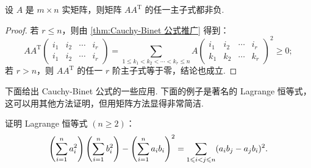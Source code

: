 \begin{corollary}{}{}
    设 $A$ 是 $m \times n$ 实矩阵，则矩阵 $AA^{\mathrm{T}}$ 的任一主子式都非负.
\end{corollary}

\begin{proof}
    若 $r \leqslant n$，则由 \autoref{thm:Cauchy-Binet 公式推广} 得到：
    \[ AA^{\mathrm{T}}
    \begin{pmatrix}
        i_1 & i_2 & \cdots & i_r \\
        i_1 & i_2 & \cdots & i_r
    \end{pmatrix}
    = \sum_{1 \leqslant k_1 < k_2 < \cdots < k_r \leqslant n} A
    \begin{pmatrix}
        i_1 & i_2 & \cdots & i_r \\
        k_1 & k_2 & \cdots & k_r
    \end{pmatrix}^2 \geqslant 0; \]
    若 $r > n$，则 $AA^\mathrm{T}$ 的任一 $r$ 阶主子式等于零，结论也成立.
\end{proof}

下面给出 Cauchy-Binet 公式的一些应用. 下面的例子是著名的 Lagrange 恒等式，这可以用其他方法证明，但用矩阵方法显得非常简洁.

\begin{example}{}{}
    证明 Lagrange 恒等式 $(n \geqslant 2)$：
    \[ \left( \sum_{i=1}^{n}\limits a_i^2 \right) \left( \sum_{i=1}^{n}\limits b_i^2 \right) - \left( \sum_{i=1}^{n}\limits a_i b_i \right)^2 = \sum_{1 \leqslant i < j \leqslant n} (a_i b_j - a_j b_i)^2. \]
\end{example}

